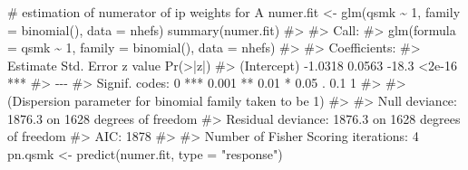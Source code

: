 \documentclass[
  10pt,
  a4paper,
]{book}
\newenvironment{Shaded}{\begin{snugshade}}{\end{snugshade}}
\newcommand{\AttributeTok}[1]{\textcolor[rgb]{0.40,0.45,0.13}{#1}}
\newcommand{\CommentTok}[1]{\textcolor[rgb]{0.37,0.37,0.37}{#1}}
\newcommand{\DecValTok}[1]{\textcolor[rgb]{0.68,0.00,0.00}{#1}}
\newcommand{\FunctionTok}[1]{\textcolor[rgb]{0.28,0.35,0.67}{#1}}
\newcommand{\NormalTok}[1]{\textcolor[rgb]{0.00,0.46,0.62}{#1}}
\newcommand{\OtherTok}[1]{\textcolor[rgb]{0.00,0.46,0.62}{#1}}
\newcommand{\SpecialCharTok}[1]{\textcolor[rgb]{0.37,0.37,0.37}{#1}}
\newcommand{\StringTok}[1]{\textcolor[rgb]{0.13,0.47,0.30}{#1}}
\begin{document}
\begin{Shaded}
\begin{Highlighting}[]
\CommentTok{\# estimation of numerator of ip weights for A}
\NormalTok{numer.fit }\OtherTok{\textless{}{-}} \FunctionTok{glm}\NormalTok{(qsmk }\SpecialCharTok{\textasciitilde{}} \DecValTok{1}\NormalTok{, }\AttributeTok{family =} \FunctionTok{binomial}\NormalTok{(), }\AttributeTok{data =}\NormalTok{ nhefs)}
\FunctionTok{summary}\NormalTok{(numer.fit)}
\CommentTok{\#\textgreater{} }
\CommentTok{\#\textgreater{} Call:}
\CommentTok{\#\textgreater{} glm(formula = qsmk \textasciitilde{} 1, family = binomial(), data = nhefs)}
\CommentTok{\#\textgreater{} }
\CommentTok{\#\textgreater{} Coefficients:}
\CommentTok{\#\textgreater{}             Estimate Std. Error z value Pr(\textgreater{}|z|)    }
\CommentTok{\#\textgreater{} (Intercept)  {-}1.0318     0.0563   {-}18.3   \textless{}2e{-}16 ***}
\CommentTok{\#\textgreater{} {-}{-}{-}}
\CommentTok{\#\textgreater{} Signif. codes:  0 \textquotesingle{}***\textquotesingle{} 0.001 \textquotesingle{}**\textquotesingle{} 0.01 \textquotesingle{}*\textquotesingle{} 0.05 \textquotesingle{}.\textquotesingle{} 0.1 \textquotesingle{} \textquotesingle{} 1}
\CommentTok{\#\textgreater{} }
\CommentTok{\#\textgreater{} (Dispersion parameter for binomial family taken to be 1)}
\CommentTok{\#\textgreater{} }
\CommentTok{\#\textgreater{}     Null deviance: 1876.3  on 1628  degrees of freedom}
\CommentTok{\#\textgreater{} Residual deviance: 1876.3  on 1628  degrees of freedom}
\CommentTok{\#\textgreater{} AIC: 1878}
\CommentTok{\#\textgreater{} }
\CommentTok{\#\textgreater{} Number of Fisher Scoring iterations: 4}
\NormalTok{pn.qsmk }\OtherTok{\textless{}{-}} \FunctionTok{predict}\NormalTok{(numer.fit, }\AttributeTok{type =} \StringTok{"response"}\NormalTok{)}


\end{Highlighting}
\end{Shaded}
\end{document}
